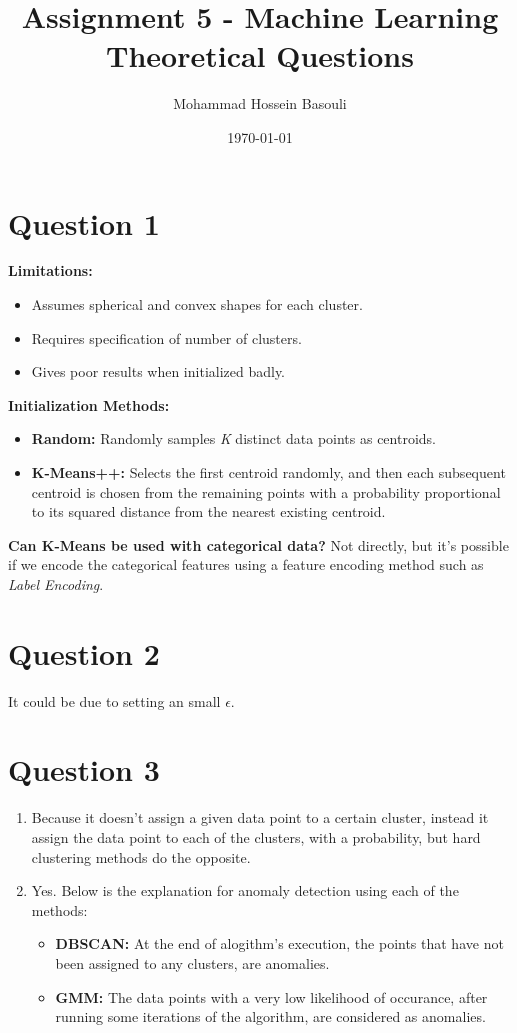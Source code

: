 \documentclass[a4paper,12pt]{article}
\begin{document}
\title{Assignment 5 - Machine Learning \\
Theoretical Questions}
\author{Mohammad Hossein Basouli}
\date{\today}
\maketitle

\section*{Question 1}
\noindent\textbf{Limitations:}
\begin{itemize}
    \item Assumes spherical and convex shapes for each cluster.
    \item Requires specification of number of clusters.
    \item Gives poor results when initialized badly.
\end{itemize}

\noindent\textbf{Initialization Methods:}
\begin{itemize}
    \item \textbf{Random:} Randomly samples \textit{K} distinct data points as centroids.
    \item \textbf{K-Means++:} Selects the first centroid randomly, and then each subsequent centroid is chosen from the remaining points with a probability proportional to its squared distance from the nearest existing centroid.
\end{itemize}

\noindent\textbf{Can K-Means be used with categorical data?}
Not directly, but it's possible if we encode the categorical features using a feature encoding method such as \textit{Label Encoding}.

\section*{Question 2}
It could be due to setting an small $\epsilon$.

\section*{Question 3}
\begin{enumerate}[label=\alph*)]
  \item Because it doesn't assign a given data point to a certain cluster, instead it assign the data point to each of the clusters, with a probability, but hard clustering methods do the opposite.
  \item Yes. Below is the explanation for anomaly detection using each of the methods:
  \begin{itemize}
    \item \textbf{DBSCAN:} At the end of alogithm's execution, the points that have not been assigned to any clusters, are anomalies.
    \item \textbf{GMM:} The data points with a very low likelihood of occurance, after running some iterations of the algorithm, are considered as anomalies.
  \end{itemize}
\end{enumerate}
\end{document}
